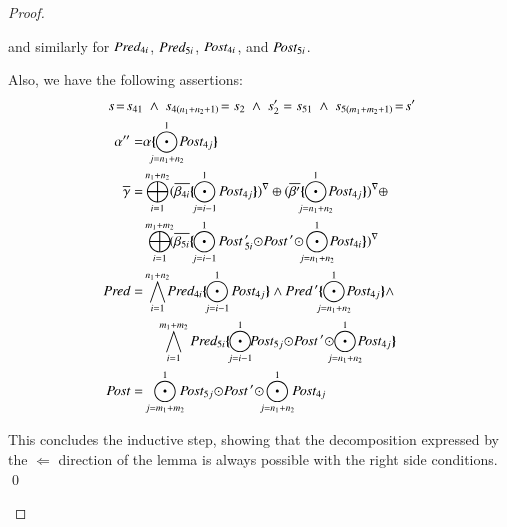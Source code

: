 \documentclass{elsarticle}
\newcommand{\shortodot}{\!\odot\!}
\begin{document}
\begin{proof}
\begin{itemize}
 and similarly for $\Pred_{4i}$, $\Pred_{5i}$, $\Post_{4i}$, and $\Post_{5i}$.  

Also, we have the following assertions:
\begin{align*}
s\!=\!s_{41}& ~\wedge~s_{4(n_1+n_2+1)}\!=s_2 ~\wedge~s_2' = s_{51} ~\wedge~ s_{5(m_1+m_2+1)}\!=\!s'\\
\alpha''=&\alpha\subst{\!\!\bigodot_{j=n_1+n_2}^{1}\!\!\!\Post_{4j}}\\
\set{\gamma}=&\bigoplus_{i=1}^{n_1+n_2} \vis{\set{\beta_{4i}}\subst{\bigodot_{j=i-1}^{1} \Post_{4 j} } }  \oplus  \vis{\set{\beta'}\subst{\!\!\bigodot_{j=n_1+n_2}^{1}\!\!\!\Post_{4j}}}\oplus \\
&\bigoplus_{i=1}^{m_1+m_2}\!\!\vis{\set{\beta_{5i}}\subst{\bigodot_{j=i-1}^{1}\Post\,'_{5i}\shortodot\Post\,'\shortodot\!\!\bigodot_{j=n_1+n_2}^{1}\!\!\!\Post_{4i}} }\\
\Pred=&
\bigwedge_{i=1}^{n_1+n_2}\!\!\Pred_{4i}\subst{\bigodot_{j=i-1}^{1}\Post_{4j}}\land\Pred\,' \subst{\!\!\bigodot_{j={n_1+n_2}}^{1}\!\!\!\Post_{4j}}\land\\ 
&\quad\bigwedge_{i=1}^{m_1+m_2}\Pred_{5i}\subst{\bigodot_{j=i-1}^{1}\!\!\Post_{5j}\shortodot\Post\,'\shortodot\!\!\!\bigodot_{j={n_1+n_2}}^{1}\!\!\!\Post_{4j}}\\
\Post=&\bigodot_{j=m_1+m_2}^{1}\!\!\!\Post_{5j}\shortodot\Post\,'\shortodot\!\!\bigodot_{j={n_1+n_2}}^{1}\!\!\Post_{4j}
\end{align*}


This concludes the inductive step, showing  that the decomposition expressed by the $\Leftarrow$ direction of the lemma is always possible with the right side conditions. \qed
\end{itemize}
\end{proof}
\end{document}
